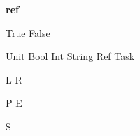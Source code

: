 


\newcommand*{\If}[3]
  {\textbf{if}\,#1\,\textbf{then}\,#2\,\textbf{else}\,#3\,}
\newoperator{\Ref}
  {\textbf{ref}}



\newoperator{\True}
  {\textsf{True}}
\newoperator{\False}
  {\textsf{False}}

\newcommand*{\astring}[1]
  {\textit{``#1''}}



\newoperator{\Unit}
  {\textsf{Unit}}
\newoperator{\Bool}
  {\textsf{Bool}}
\newoperator{\Int}
  {\textsf{Int}}
\newoperator{\String}
  {\textsf{String}}
\newoperator{\Reference}
  {\textsf{Ref}}
\newoperator{\Task}
  {\textsf{Task}}



\newoperator{\Done}
  {\checkmark}
\newoperator{\Then}
  {\vartriangleright}
\newoperator{\When}
  {\blacktriangleright}
\let\And\relax
\newoperator{\And}
  {\otimes}
\newoperator{\Or}
  {\oplus}
\newoperator{\Edit}
  {\square}
\newoperator{\Empty}
  {\boxtimes}
\newoperator{\Watch}
  {\blacksquare}
\newoperator{\Fail}
  {\circlearrowleft}

\newoperator{\Both}
  {\odot}



\newoperator{\Left}
  {\textsf{L}}
\newoperator{\Right}
  {\textsf{R}}

\newcommand*{\Clear}
  {\textsf{C}}
\newcommand*{\Next}
  {\textsf{N}}
\newoperator{\Pick}
  {\textsf{P}}
\newoperator{\Execute}
  {\textsf{E}}


\newcommand*{\First}
  {\textsf{F}}
\newcommand*{\Second}
  {\textsf{S}}
\newoperator{\Other}
  {\textsf{S}}



\newcommand*{\downto}
  {\Downarrow}
\newcommand*{\normalise}
  {\;\rightarrow\!\shortmid\;}
\newcommand*{\handle}[1]
  {\;\xrightarrow{\;#1\;}\;}

\newcommand*{\Value}
  {\mathcal{V}}
